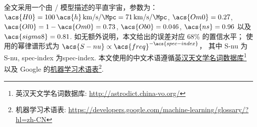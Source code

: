 全文采用一个由 \lcdm/ 模型描述的平直宇宙，参数为：
$\acs{H0} = 100\,\acs{h}\,\si{\km\per\second\per\Mpc}
= \SI{71}{\km\per\second\per\Mpc}$,
$\acs{Om0} = 0.27$,
$\acs{Ol0} = 1 - \acs{Om0} = 0.73$,
$\acs{Ob0} = 0.046$,
$\acs{ns} = 0.96$ 以及 $\acs{sigma8} = 0.81$.
如无额外说明，本文给出的误差对应 68\% 的置信水平；
使用的幂律谱形式为 $\acs{S-nu} \propto \acs{freq}^{-\acs{spec-index}}$，
其中 \acs{S-nu} 为\acl{S-nu}, \acs{spec-index} 为\acl{spec-index}.
本文使用的中文术语遵循\href{%
  http://astrodict.china-vo.org/
}{英汉天文学名词数据库}\footnote{%
  英汉天文学名词数据库:
  \url{http://astrodict.china-vo.org/}}
以及 Google 的\href{%
  https://developers.google.com/machine-learning/glossary/?hl=zh-CN
}{机器学习术语表}\footnote{%
  机器学习术语表:
  \url{https://developers.google.com/machine-learning/glossary/?hl=zh-CN}}.


